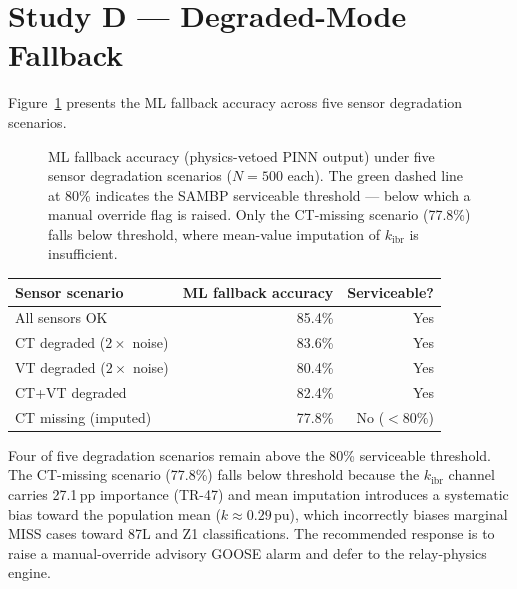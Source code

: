 \documentclass[11pt,a4paper]{article}
\begin{document}
\section{Study D --- Degraded-Mode Fallback}
\label{sec:studyD}

Figure~\ref{fig:degraded} presents the ML fallback accuracy across five sensor
degradation scenarios.

\begin{figure}[htbp]
  \centering
  \resizebox{0.96\textwidth}{!}{}
  \caption{ML fallback accuracy (physics-vetoed PINN output) under five
           sensor degradation scenarios ($N=500$ each).  The green dashed
           line at 80\% indicates the SAMBP serviceable threshold --- below
           which a manual override flag is raised.  Only the CT-missing
           scenario (77.8\%) falls below threshold, where mean-value
           imputation of $k_\mathrm{ibr}$ is insufficient.}
  \label{fig:degraded}
\end{figure}

\begin{center}
\begin{tabular}{@{}lrr@{}}
\toprule
Sensor scenario & ML fallback accuracy & Serviceable? \\
\midrule
All sensors OK & 85.4\% & Yes \\
CT degraded ($2\times$ noise) & 83.6\% & Yes \\
VT degraded ($2\times$ noise) & 80.4\% & Yes \\
CT+VT degraded & 82.4\% & Yes \\
CT missing (imputed) & 77.8\% & No ($<80\%$) \\
\bottomrule
\end{tabular}
\end{center}

\medskip\noindent
Four of five degradation scenarios remain above the 80\% serviceable threshold.
The CT-missing scenario (77.8\%) falls below threshold because the
$k_\mathrm{ibr}$ channel carries 27.1\,pp importance (TR-47) and mean
imputation introduces a systematic bias toward the population mean
($k\approx0.29$\,pu), which incorrectly biases marginal MISS cases toward
87L and Z1 classifications.  The recommended response is to raise a
manual-override advisory GOOSE alarm and defer to the relay-physics engine.

\end{document}
